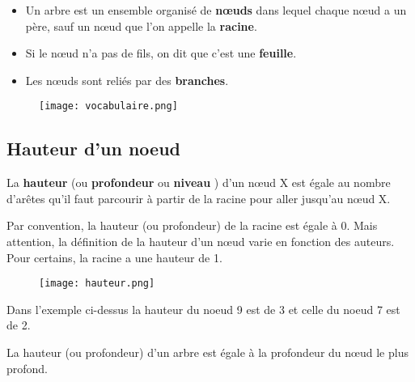 \documentclass[french]{article}
\theoremstyle{plain}
\begin{document}
		\begin{tcolorbox}[colback=red!5!white,colframe=red!75!black,title=A retenir !]
	
\begin{itemize}[label=$\triangleright$]
	\item Un arbre est un ensemble organisé de \textbf{nœuds} dans lequel chaque nœud a un père, sauf un nœud que l'on appelle la \textbf{racine}. 
	\item Si le nœud  n'a pas de fils, on dit que c'est une \textbf{feuille}.
	\item Les nœuds sont reliés par des \textbf{branches}.
\end{itemize}

	\end{tcolorbox}
	
				\begin{figure}[h]  %
		\centering
		\texttt{[image: vocabulaire.png]}
	\end{figure}
	
	\newpage
	
	\subsection{Hauteur d'un noeud}
	
			\begin{tcolorbox}[colback=red!5!white,colframe=red!75!black,title=A retenir !]
		
La \textbf{hauteur} (ou \textbf{profondeur} ou \textbf{niveau} ) d'un nœud X est égale au nombre d'arêtes qu'il faut parcourir à partir de la racine pour aller jusqu'au nœud X.
		
	\end{tcolorbox}
	
Par convention, la hauteur (ou profondeur) de la racine est égale à 0. Mais attention, la définition de la hauteur d'un nœud varie en fonction des auteurs. Pour certains, la racine a une hauteur de 1.


\begin{figure}[h]  %
	\centering
	\texttt{[image: hauteur.png]}
\end{figure}

Dans l'exemple ci-dessus la hauteur du noeud 9 est de 3 et celle du noeud 7 est de 2.

	\begin{tcolorbox}[colback=red!5!white,colframe=red!75!black,title=A retenir !]
	
La hauteur (ou profondeur) d'un arbre est égale à la profondeur du nœud le plus profond.
	
\end{tcolorbox}
\end{document}
